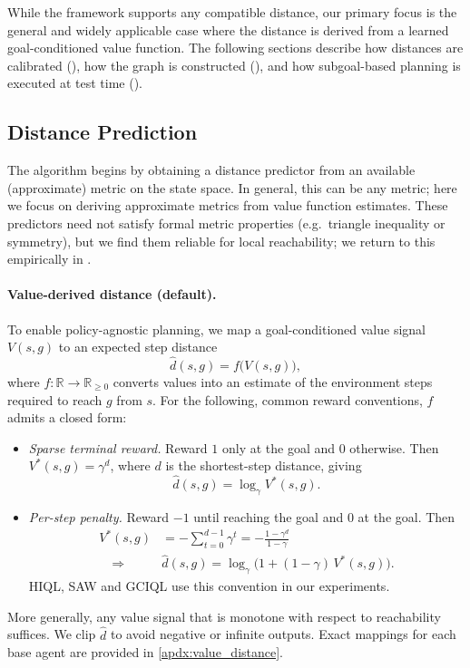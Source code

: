 \documentclass{article} %
\begin{document}
While the framework supports any compatible distance, our primary focus is the general and widely applicable case where the distance is derived from a learned goal-conditioned value function. The following sections describe how distances are calibrated (), how the graph is constructed (), and how subgoal-based planning is executed at test time ().

\subsection{Distance Prediction}
\label{subsec:distance}

The algorithm begins by obtaining a distance predictor from an available (approximate) metric on the state space. In general, this can be any metric; here we focus on deriving approximate metrics from value function estimates. These predictors need not satisfy formal metric properties (e.g.\ triangle inequality or symmetry), but we find them reliable for local reachability; we return to this empirically in .

\paragraph{Value-derived distance (default).}
To enable policy-agnostic planning, we map a goal-conditioned value signal $V(s,g)$ to an expected step distance
\[
    \hat d(s, g) = f\big(V(s, g)\big),
\]
where $f:\mathbb{R}\to\mathbb{R}_{\ge 0}$ converts values into an estimate of the environment steps required to reach $g$ from $s$. For the following, common reward conventions, $f$ admits a closed form:
\begin{itemize}[leftmargin=*]
    \item \emph{Sparse terminal reward.} Reward $1$ only at the goal and $0$ otherwise. Then $V^*(s,g)=\gamma^{d}$, where $d$ is the shortest-step distance, giving
\[
    \hat d(s,g)=\log_{\gamma} V^*(s,g).
\]
\item \emph{Per-step penalty.} Reward $-1$ until reaching the goal and $0$ at the goal. Then
\begin{align*}
    V^*(s,g)&=-\sum_{t=0}^{d-1}\gamma^{t}= -\frac{1-\gamma^{d}}{1-\gamma} \\
    \quad\Rightarrow\quad&
    \hat d(s,g)=\log_{\gamma}\!\big(1+(1-\gamma)\,V^*(s,g)\big).
\end{align*}
HIQL, SAW and GCIQL use this convention in our experiments. 
\end{itemize}
More generally, any value signal that is monotone with respect to reachability suffices. We clip $\hat d$ to avoid negative or infinite outputs. Exact mappings for each base agent are provided in \autoref{apdx:value_distance}.
\end{document}
